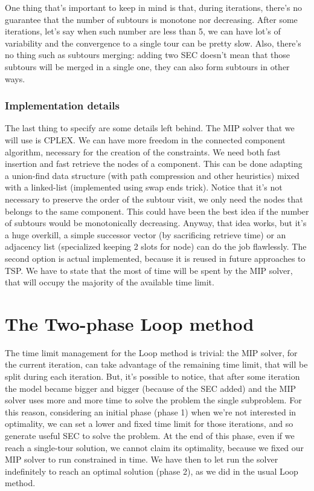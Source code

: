 One thing that's important to keep in mind is that, during iterations, there's
no guarantee that the number of subtours is monotone nor decreasing. After some
iterations, let's say when such number are less than 5, we can have lot's of
variability and the convergence to a single tour can be pretty slow. Also,
there's no thing such as subtours merging: adding two SEC doesn't mean that
those subtours will be merged in a single one, they can also form subtours in
other ways.

\subsubsection{Implementation details}
The last thing to specify are some details left behind. The MIP solver
that we will use is CPLEX. We can have more freedom in the connected component
algorithm, necessary for the creation of the constraints. We need both fast
insertion and fast retrieve the nodes of a component. This can be done adapting
a union-find data structure (with path compression and other heuristics) mixed
with a linked-list (implemented using swap ends trick). Notice that it's not
necessary to preserve the order of the subtour visit, we only need the nodes
that belongs to the same component. This could have been the best idea if the
number of subtours would be monotonically decreasing. Anyway, that idea works,
but it's a huge overkill, a simple successor vector (by sacrificing retrieve
time) or an adjacency list (specialized keeping 2 slots for node) can do the job
flawlessly. The second option is actual implemented, because it is reused in
future approaches to TSP. We have to state that the most of time will be spent
by the MIP solver, that will occupy the majority of the  available time limit.

\section{The Two-phase Loop method}
The time limit management for the Loop method is trivial: the MIP solver, for
the current iteration, can take advantage of the remaining time limit, that
will be split during each iteration. But, it's possible to notice, that after
some iteration the model became bigger and bigger (because of the SEC added)
and the MIP solver uses more and more time to solve the problem the single
subproblem. For this reason, considering an initial phase (phase 1) when we're
not interested in optimality, we can set a lower and fixed time limit for those
iterations, and so generate useful SEC to solve the problem. At the end of this
phase, even if we reach a single-tour solution, we cannot claim its optimality,
because we fixed our MIP solver to run constrained in time. We have then to let
run the solver indefinitely to reach an optimal solution (phase 2), as we did in
the usual Loop method. 

